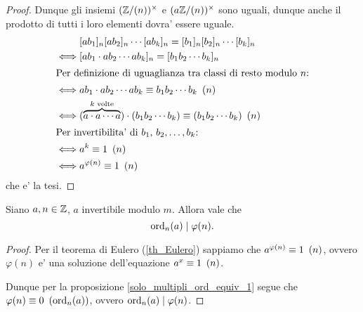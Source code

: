 \begin{proof}
    Dunque gli insiemi $\inverses{\Z/(n)}$ e $\inverses{a\Z/(n)}$ sono uguali, dunque anche il prodotto di tutti i loro elementi dovra' essere uguale.
    \begin{alignat*}
        {1}
        &[ab_1]_n[ab_2]_n\cdots [ab_k]_n = [b_1]_n[b_2]_n\cdots [b_k]_n\\
        \iff &[ab_1 \cdot ab_2 \cdots ab_k]_n = [b_1b_2\cdots b_k]_n\\
        \intertext{Per definizione di uguaglianza tra classi di resto modulo $n$:}
        \iff &ab_1 \cdot ab_2 \cdots ab_k \equiv b_1b_2\cdots b_k \Mod{n} \\
        \iff &(\overbrace{a\cdot a \cdots a}^{k \text{ volte}}) \cdot (b_1b_2\cdots b_k) \equiv (b_1b_2\cdots b_k) \Mod{n}\\
        \intertext{Per invertibilita' di $b_1$, $b_2, \dots, b_k$:}
        \iff &a^k \equiv 1 \Mod{n}\\
        \iff &a^{\varphi(n)} \equiv 1 \Mod{n}
    \end{alignat*}
    che e' la tesi.
\end{proof}

\begin{proposition}
    Siano $a, n \in \Z$, $a$ invertibile modulo $m$. Allora vale che \[
        \ord{a}{n} \divides \varphi(n).    
    \]
\end{proposition}
\begin{proof}
    Per il teorema di Eulero (\ref{th_Eulero}) sappiamo che $a^{\varphi(n)} \equiv 1 \Mod{n}$, ovvero $\varphi(n)$ e' una soluzione dell'equazione $a^x \equiv 1 \Mod{n}$. 
    
    Dunque per la proposizione \ref{solo_multipli_ord_equiv_1} segue che $\varphi(n) \equiv 0 \Mod{\ord{a}{n}}$, ovvero $\ord{a}{n} \divides \varphi(n)$.
\end{proof}